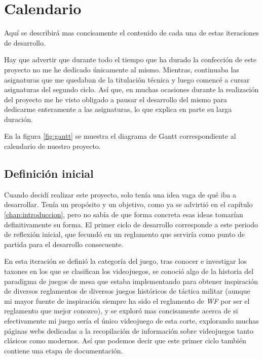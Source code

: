 %


\section{Calendario}
\label{sec:calendario}

Aquí se describirá mas concisamente el contenido de cada una de estas
iteraciones de desarrollo.

Hay que advertir que durante todo el tiempo que ha
durado la confección de este proyecto no me he dedicado únicamente al
mismo. Mientras, continuaba las asignaturas que me quedaban de la
titulación técnica y luego comencé a cursar asignaturas del segundo
ciclo. Así que, en muchas ocasiones durante la realización del
proyecto me he visto obligado a pausar el desarrollo del mismo para
dedicarme enteramente a las asignaturas, lo que explica en parte su
larga duración.

En la figura \ref{fig:gantt} se muestra el diagrama de Gantt
correspondiente al calendario de nuestro proyecto.

\subsection{Definición inicial}
Cuando decidí realizar este proyecto, solo tenía una idea vaga de qué
iba a desarrollar. Tenía un propósito y un objetivo, como ya se
advirtió en el capítulo \ref{chap:introduccion}, pero no
sabía de que forma concreta esas ideas tomarían definitivamente
su forma. El primer ciclo de desarrollo corresponde a este periodo de
reflexión inicial, que fecundó en un reglamento que serviría como
punto de partida para el desarrollo consecuente.

En esta iteración se definió la categoría del juego, tras conocer e
investigar los taxones en los que se clasifican los videojuegos, se
conoció algo de la historia del paradigma de juegos de mesa que estaba
implementando para obtener inspiración de diversos reglamentos de
diversos juegos históricos de táctica militar (aunque mi mayor fuente
de inspiración siempre ha sido el reglamento de \emph{WF} por
ser el reglamento que mejor conozco), y se exploró mas concisamente
acerca de si efectivamente mi juego sería el único videojuego de esta
corte, explorando muchas páginas webs dedicadas a la recopilación de
información sobre videojuegos tanto clásicos como modernos. Así que
podemos decir que este primer ciclo también contiene una etapa de
documentación.

